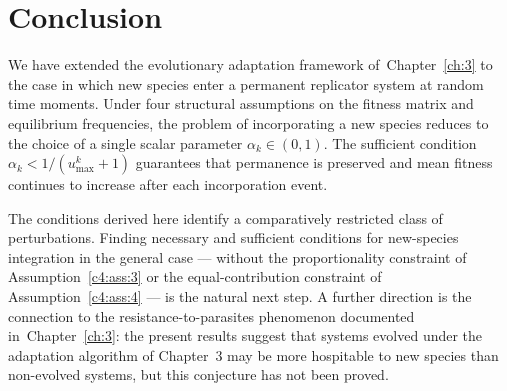 \documentclass[12pt]{report}
\theoremstyle{definition}
\theoremstyle{remark}
\begin{document}
\clearpage
\section*{Conclusion}

We have extended the evolutionary adaptation framework of~Chapter~\ref{ch:3}
to the case in which new species enter a permanent replicator system at random
time moments. Under four structural assumptions on the fitness matrix and
equilibrium frequencies, the problem of incorporating a new species reduces to
the choice of a single scalar parameter $\alpha_k \in (0, 1)$. The sufficient
condition $\alpha_k < 1/(u_{\max}^k + 1)$ guarantees that permanence is
preserved and mean fitness continues to increase after each incorporation event.

The conditions derived here identify a comparatively restricted class of
perturbations. Finding necessary and sufficient conditions for new-species
integration in the general case --- without the proportionality constraint of
Assumption~\ref{c4:ass:3} or the equal-contribution constraint of
Assumption~\ref{c4:ass:4} --- is the natural next step. A further direction is the
connection to the resistance-to-parasites phenomenon documented
in~Chapter~\ref{ch:3}: the present results suggest that systems evolved under
the adaptation algorithm of Chapter~3 may be more hospitable to new species
than non-evolved systems, but this conjecture has not been proved.
\end{document}
